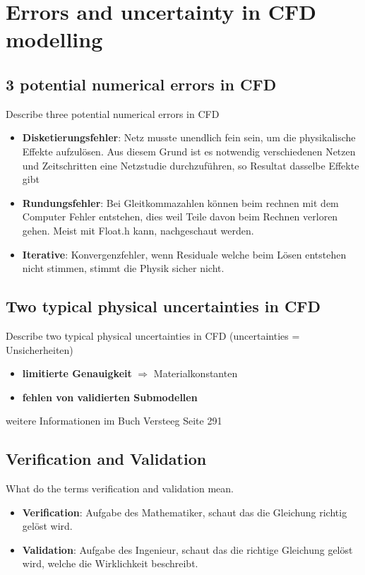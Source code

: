 \documentclass[a4paper]{scrartcl}
\begin{document}
\section{Errors and uncertainty in CFD modelling}

\subsection{3 potential numerical errors in CFD}

Describe three potential numerical errors in CFD
\begin{itemize}
\item \textbf{Disketierungsfehler}: Netz musste unendlich fein sein, um die physikalische Effekte aufzulösen. Aus diesem Grund ist es notwendig verschiedenen Netzen und Zeitschritten eine Netzstudie durchzuführen, so Resultat dasselbe Effekte gibt
\item \textbf{Rundungsfehler}: Bei Gleitkommazahlen können beim rechnen mit dem
Computer Fehler entstehen, dies weil Teile davon beim Rechnen verloren gehen.
Meist mit Float.h kann, nachgeschaut werden.
\item \textbf{Iterative}: Konvergenzfehler, wenn Residuale welche beim Lösen entstehen nicht stimmen, stimmt die Physik sicher nicht.  
\end{itemize}

\subsection{Two typical physical uncertainties in CFD}
Describe two typical physical uncertainties in CFD (uncertainties =
Unsicherheiten)
\begin{itemize}
\item \textbf{limitierte Genauigkeit} $\Rightarrow$ Materialkonstanten
\item \textbf{fehlen von validierten Submodellen}
\end{itemize}
weitere Informationen im Buch Versteeg Seite 291

\subsection{Verification and Validation} 
What do the terms verification and
validation mean.
\begin{itemize}
\item \textbf{Verification}: Aufgabe des Mathematiker, schaut das die Gleichung richtig gelöst wird.
\item \textbf{Validation}: Aufgabe des Ingenieur, schaut das die richtige Gleichung gelöst wird, welche die Wirklichkeit beschreibt.
\end{itemize}
\end{document}
